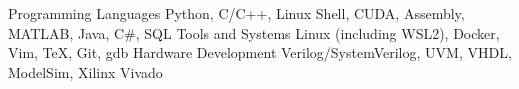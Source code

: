 
\begin{cvskills}

  \cvskill
    {Programming Languages} %
    {Python, C/C++, Linux Shell, CUDA, Assembly, MATLAB, Java, C\#, SQL} %
  \cvskill
    {Tools and Systems} %
    {Linux (including WSL2), Docker, Vim, TeX, Git, gdb} %
  \cvskill
    {Hardware Development} %
    {Verilog/SystemVerilog, UVM, VHDL, ModelSim, Xilinx Vivado} %
    
\end{cvskills}
